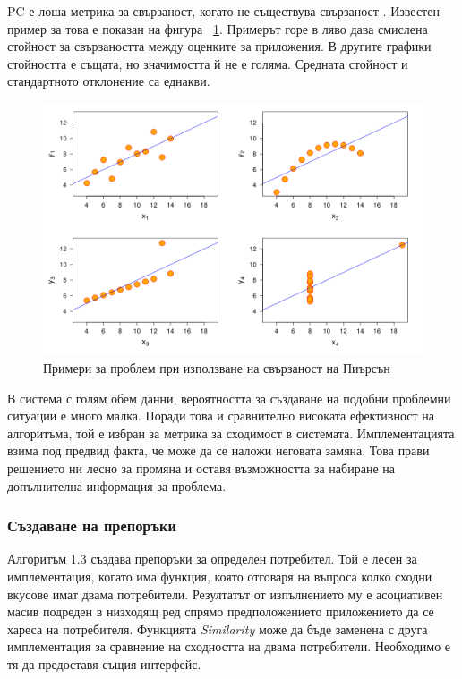 		\vspace{2em}
		
		\ac{PC} е лоша метрика за свързаност, когато не съществува свързаност \cite{Babenko}. Известен пример за това е показан на фигура ~\ref{figure:anscombe-quartet}. Примерът горе в ляво дава смислена стойност за свързаността между оценките за приложения. В другите графики стойността е същата, но значимостта й не е голяма. Средната стойност и стандартното отклонение са еднакви.
		
		\begin{figure}[htbp]
			\centering	
 			\includegraphics[scale=0.8]{assets/Anscombe-quartet.png}
			\caption{Примери за проблем при използване на свързаност на Пиърсън}
			\label{figure:anscombe-quartet}
		\end{figure}
		
		В система с голям обем данни, вероятността за създаване на подобни проблемни ситуации е много малка. Поради това и сравнително високата ефективност на алгоритъма, той е избран за метрика за сходимост в системата. Имплементацията взима под предвид факта, че може да се наложи неговата замяна. Това прави решението ни лесно за промяна и оставя възможността за набиране на допълнителна информация за проблема.
				
		\subsubsection{Създаване на препоръки}
		
		Алгоритъм 1.3 създава препоръки за определен потребител. Той е лесен за имплементация, когато има функция, която отговаря на въпроса колко сходни вкусове имат двама потребители. Резултатът от изпълнението му е асоциативен масив подреден в низходящ ред спрямо предположението приложението да се хареса на потребителя. Функцията \emph{Similarity} може да бъде заменена с друга имплементация за сравнение на сходността на двама потребители. Необходимо е тя да предоставя същия интерфейс.
		
